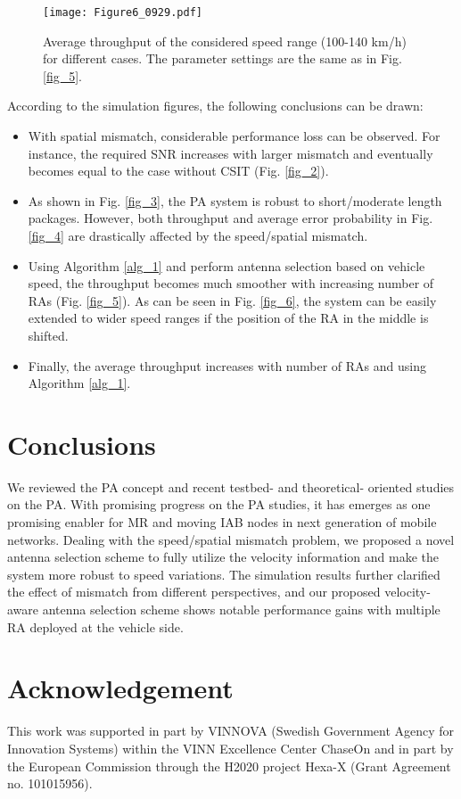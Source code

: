 \documentclass[conference]{IEEEtran}
\begin{document}
\begin{figure}
\centering
  \texttt{[image: Figure6\_0929.pdf]}\\
\caption{Average throughput of the considered speed range (100-140 km/h) for different cases. The parameter settings are the same as in Fig. \ref{fig_5}.}
\label{fig_7}
\end{figure}


According to the simulation figures, the following conclusions can be drawn:
\begin{itemize}
    \item With spatial mismatch, considerable performance loss can be observed. For instance, the required \ac{SNR} increases with larger mismatch and eventually becomes equal to the case without \ac{CSIT} (Fig. \ref{fig_2}). 
    \item As shown in Fig. \ref{fig_3}, the \ac{PA} system is robust to short/moderate length packages. However, both throughput and average error probability in Fig. \ref{fig_4} are drastically affected by the speed/spatial mismatch. 
    \item Using Algorithm \ref{alg_1} and perform antenna selection based on vehicle speed, the throughput becomes much smoother with increasing number of \acp{RA}  (Fig. \ref{fig_5}). As can be seen in Fig. \ref{fig_6}, the system can be easily extended to wider speed ranges if the position of the \ac{RA} in the middle is shifted.
    \item Finally, the average throughput increases with number of \acp{RA} and using Algorithm \ref{alg_1}.
\end{itemize}


\section{Conclusions}
We reviewed the PA concept and recent testbed- and theoretical- oriented studies on the PA. With promising progress on the PA studies, it has emerges as one promising enabler for MR and moving IAB nodes in next generation of mobile networks. Dealing with the speed/spatial mismatch problem, we proposed a novel antenna selection scheme to fully utilize the velocity information and make the system more robust to speed variations. The simulation results further clarified the effect of mismatch from different perspectives, and our proposed velocity-aware antenna selection  scheme shows notable performance gains with multiple RA deployed at the vehicle side.  


\section*{Acknowledgement}
This work was supported in part by VINNOVA (Swedish Government Agency for Innovation Systems) within the VINN Excellence Center ChaseOn and in part by the European Commission through the H2020 project Hexa-X (Grant Agreement no. 101015956).




\end{document}
